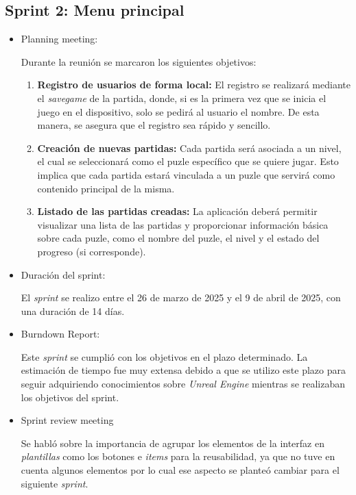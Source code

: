 \subsection{\textbf{Sprint 2: Menu principal } }
\begin{itemize}
    \item {Planning meeting:}
    
    Durante la reunión se marcaron los siguientes objetivos:
    \begin{enumerate}
        \item \textbf{Registro de usuarios de forma local:} El registro se realizará mediante el \textit{savegame} de la partida, donde, si es la primera vez que se inicia el juego en el dispositivo, solo se pedirá al usuario el nombre. De esta manera, se asegura que el registro sea rápido y sencillo. 
    
        \item \textbf{Creación de nuevas partidas:} Cada partida será asociada a un nivel, el cual se seleccionará como el puzle específico que se quiere jugar. Esto implica que cada partida estará vinculada a un puzle que servirá como contenido principal de la misma. 
    
        \item \textbf{Listado de las partidas creadas:} La aplicación deberá permitir visualizar una lista de las partidas y proporcionar información básica sobre cada puzle, como el nombre del puzle, el nivel y el estado del progreso (si corresponde). 
    \end{enumerate}
    
    
        \item Duración del sprint:
    
    El \textit{sprint } se realizo entre el 26 de marzo de 2025 y el 9 de abril de 2025, con una duración de 14 días.
    
    
        \item {Burndown Report:}
    
    Este \textit{sprint} se cumplió con los objetivos en el plazo determinado. La estimación de tiempo fue muy extensa debido a que se utilizo este plazo para seguir adquiriendo conocimientos sobre \textit{Unreal Engine} mientras se realizaban los objetivos del sprint.
    
    
    
    \item {Sprint review meeting}
    
    Se habló sobre la importancia de agrupar los elementos de la interfaz en \textit{plantillas} como los botones e \textit{items} para la reusabilidad, ya que no tuve en cuenta algunos elementos por lo cual ese aspecto se planteó cambiar para el siguiente \textit{sprint}.
\end{itemize}

